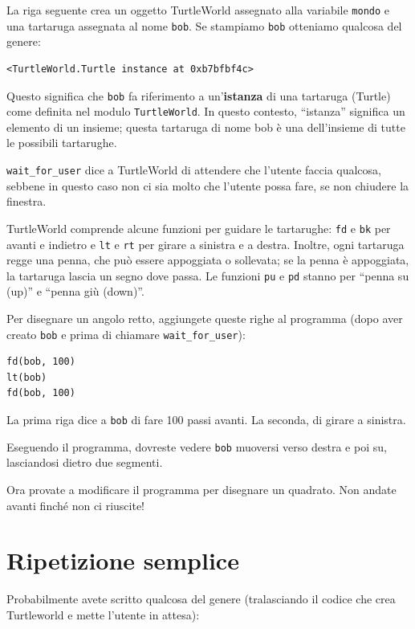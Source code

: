 \documentclass[10pt]{book}
\begin{document}
La riga seguente crea un oggetto TurtleWorld assegnato alla variabile {\tt mondo} e una tartaruga assegnata al nome {\tt bob}. Se stampiamo {\tt bob} otteniamo qualcosa del genere:

\begin{verbatim}
<TurtleWorld.Turtle instance at 0xb7bfbf4c>
\end{verbatim}
%
Questo significa che {\tt bob} fa riferimento a un'{\bf istanza} di una tartaruga (Turtle) come definita nel modulo {\tt TurtleWorld}. In questo contesto, ``istanza'' significa un elemento di un insieme; questa tartaruga di nome bob è una dell'insieme di tutte le possibili tartarughe.

\verb"wait_for_user" dice a TurtleWorld di attendere che l'utente faccia qualcosa, sebbene in questo caso non ci sia molto che l'utente possa fare, se non chiudere la finestra.

TurtleWorld comprende alcune funzioni per guidare le tartarughe: {\tt fd} e {\tt bk} per avanti e indietro e {\tt lt} e {\tt rt} per girare a sinistra e a destra. Inoltre, ogni tartaruga regge una penna, che può essere appoggiata o sollevata; se la penna è appoggiata, la tartaruga lascia un segno dove passa. Le funzioni {\tt pu} e {\tt pd} stanno per ``penna su (up)'' e ``penna giù (down)''.

Per disegnare un angolo retto, aggiungete queste righe al programma (dopo aver creato {\tt bob} e prima di chiamare \verb"wait_for_user"):

\begin{verbatim}
fd(bob, 100)
lt(bob)
fd(bob, 100)
\end{verbatim}
%
La prima riga dice a {\tt bob} di fare 100 passi avanti. La seconda, di girare a sinistra.

Eseguendo il programma, dovreste vedere {\tt bob} muoversi verso destra e poi su, lasciandosi dietro due segmenti.

Ora provate a modificare il programma per disegnare un quadrato. Non andate avanti finché non ci riuscite!


\section{Ripetizione semplice}
\label{repetition}

Probabilmente avete scritto qualcosa del genere (tralasciando il codice che crea Turtleworld e mette l'utente in attesa):
\end{document}
